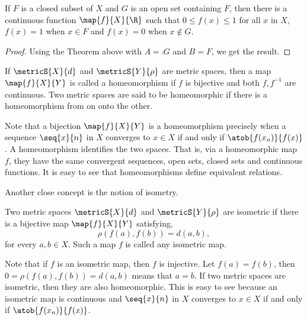 \begin{Corollary}
    If $F$ is a closed subset of $X$ and $G$ is an open set containing $F$, then there is a continuous
    function $\map{f}{X}{\R}$ such that $0 \leq f(x) \leq 1$ for all $x$ in $X$, $f(x) = 1$ when $x \in F$ and
    $f(x) = 0$ when $x \not \in G$.
\end{Corollary}
\begin{proof}
    Using the Theorem above with $A = \comp{G}$ and $B = F$, we get the result.
\end{proof}
\begin{Definition}[name= Homeomorphism]
    If $\metricS{X}{d}$ and $\metricS{Y}{\rho}$ are metric spaces, then a map $\map{f}{X}{Y}$ is called a 
    homeomorphism if $f$ is bijective and both $f,f^{-1}$ are continuous. Two metric spaces are said to be
    homeomorphic if there is a homeomorphism from on onto the other.
\end{Definition}
\begin{Remark}
    Note that a bijection $\map{f}{X}{Y}$ is a homeomorphism precisely when a sequence $\seq{x}{n}$ in $X$
    converges to $x \in X$ if and only if $\atob{f(x_n)}{f(x)}$. A homeomorphism identifies the two spaces.
    That is, via a homeomorphic map $f$, they have the same convergent sequences, open sets, closed sets and
    continuous functions. It is easy to see that homeomorphisms define equivalent relations.
\end{Remark}
Another close concept is the notion of isometry.
\begin{Definition}[name=Isometry]
    Two metric spaces $\metricS{X}{d}$ and $\metricS{Y}{\rho}$ are isometric if there is a bijective map 
    $\map{f}{X}{Y}$ satisfying,
    \[\rho(f(a),f(b)) = d(a,b),\]
    for every $a,b \in X$. Such a map $f$ is called any isometric map.
\end{Definition}
\begin{Remark}
    Note that if $f$ is an isometric map, then $f$ is injective. Let $f(a) = f(b)$, then
    $0 = \rho(f(a),f(b)) = d(a,b)$ means that $a = b$.
    If two metric spaces are isometric, then they are also homeomorphic. This is easy to see because an
    isometric map is continuous and  $\seq{x}{n}$ in $X$
    converges to $x \in X$ if and only if $\atob{f(x_n)}{f(x)}$.
\end{Remark}


